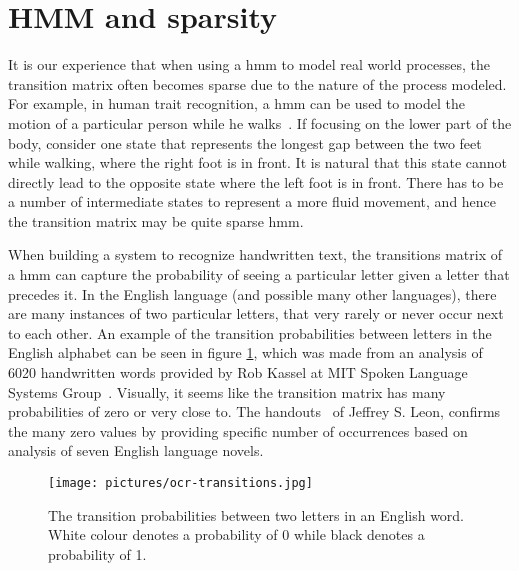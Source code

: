 \section{HMM and sparsity}
\label{sec:hmm-and-sparsity}
It is our experience that when using a \gls{hmm} to model real world processes, the transition matrix often becomes sparse due to the nature of the process modeled.
For example, in human trait recognition, a \gls{hmm} can be used to model the motion of a particular person while he walks~\cite{trait-recognition}.
If focusing on the lower part of the body, consider one state that represents the longest gap between the two feet while walking, where the right foot is in front. It is natural that this state cannot directly lead to the opposite state where the left foot is in front. There has to be a number of intermediate states to represent a more fluid movement, and hence the transition matrix may be quite sparse \gls{hmm}.

When building a system to recognize handwritten text, the transitions matrix of a \gls{hmm} can capture the probability of seeing a particular letter given a letter that precedes it.
In the English language (and possible many other languages), there are many instances of two particular letters, that very rarely or never occur next to each other. An example of the transition probabilities between letters in the English alphabet can be seen in figure \ref{fig:ocr-transitions}, which was made from an analysis of 6020 handwritten words provided by Rob Kassel at MIT Spoken Language Systems Group~\cite{thomas-letter-pair-analysis-picture}. Visually, it seems like the transition matrix has many probabilities of zero or very close to. The handouts~\cite{leon-letter-pair-analysis-handouts} of Jeffrey S. Leon, confirms the many zero values by providing specific number of occurrences based on analysis of seven English language novels.

\begin{figure}
\begin{centering}
\texttt{[image: pictures/ocr-transitions.jpg]}
\caption{The transition probabilities between two letters in an English word. White colour denotes a probability of 0 while black denotes a probability of 1.}
\label{fig:ocr-transitions}
\end{centering}
\end{figure}
